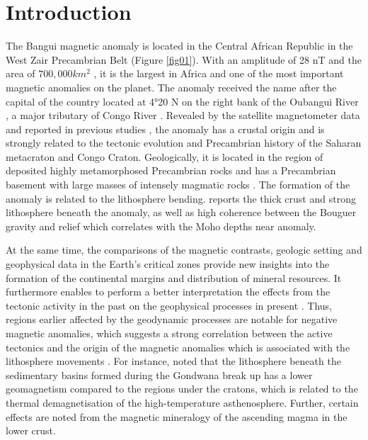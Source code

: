 \documentclass[minerals,article,submit,pdftex,moreauthors]{Definitions/mdpi}
\begin{document}
\section{Introduction}
The Bangui magnetic anomaly is located in the Central African Republic in the West Zair Precambrian Belt (Figure \ref{fig01}). With an amplitude of 28 nT and the area of $700,000 km^2$ \cite{girdler1992possible}, it is the largest in Africa and one of the most important magnetic anomalies on the planet. The anomaly received the name after the capital of the country located at 4°20 N on the right bank of the Oubangui River \cite{Baticle,Villien1990}, a major tributary of Congo River \cite{Vennetier}. Revealed by the satellite magnetometer data and reported in previous studies \cite{Regan,OUABEGO201311,NJITEUTCHOUKEU2021104206}, the anomaly has a crustal origin and is strongly related to the tectonic evolution and Precambrian history of the Saharan metacraton and Congo Craton. Geologically, it is located in the region of deposited highly metamorphosed Precambrian rocks and has a Precambrian basement with large masses of intensely magmatic rocks \cite{Kochemasov} . The formation of the anomaly is related to the lithosphere bending. \cite{NJITEUTCHOUKEU2021104299} reports the thick crust and strong lithosphere beneath the anomaly, as well as high coherence between the Bouguer gravity and relief which correlates with the Moho depths near anomaly.

At the same time, the comparisons of the magnetic contrasts, geologic setting and geophysical data in the Earth's critical zones provide new insights into the formation of the continental margins and distribution of mineral resources. It furthermore enables to perform a better interpretation the effects from the tectonic activity in the past on the geophysical processes in present \cite{FELIXTOTEU2002906}. Thus, regions earlier affected by the geodynamic processes are notable for negative magnetic anomalies, which suggests a strong correlation between the active tectonics and the origin of the magnetic anomalies which is associated with the lithosphere movements \cite{RAVAT199259}. For instance, \cite{ARKANIHAMED1985257} noted that the lithosphere beneath the sedimentary basins formed during the Gondwana break up has a lower geomagnetism compared to the regions under the cratons, which is related to the thermal demagnetisation of the high-temperature asthenosphere. Further, certain effects are noted from the magnetic mineralogy of the ascending magma in the lower crust.
\end{document}
